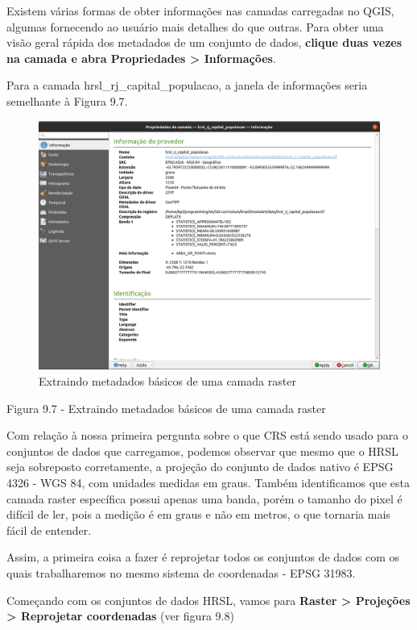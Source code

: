 \documentclass[
  portuguese,
]{krantz}
\begin{document}
Existem várias formas de obter informações nas camadas carregadas no QGIS, algumas fornecendo ao usuário mais detalhes do que outras. Para obter uma visão geral rápida dos metadados de um conjunto de dados, \textbf{clique duas vezes na camada e abra Propriedades \textgreater{} Informações}.

Para a camada hrsl\_rj\_capital\_populacao, a janela de informações seria semelhante à Figura 9.7.

\begin{figure}
\centering
\includegraphics{media/modulo9/fig97.png}
\caption{Extraindo metadados básicos de uma camada raster}
\end{figure}

Figura 9.7 - Extraindo metadados básicos de uma camada raster

Com relação à nossa primeira pergunta sobre o que CRS está sendo usado para o conjuntos de dados que carregamos, podemos observar que mesmo que o HRSL seja sobreposto corretamente, a projeção do conjunto de dados nativo é EPSG 4326 - WGS 84, com unidades medidas em graus. Também identificamos que esta camada raster específica possui apenas uma banda, porém o tamanho do pixel é difícil de ler, pois a medição é em graus e não em metros, o que tornaria mais fácil de entender.

Assim, a primeira coisa a fazer é reprojetar todos os conjuntos de dados com os quais trabalharemos no mesmo sistema de coordenadas - EPSG 31983.

Começando com os conjuntos de dados HRSL, vamos para \textbf{Raster \textgreater{} Projeções \textgreater{} Reprojetar coordenadas} (ver figura 9.8)
\end{document}
